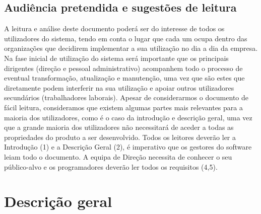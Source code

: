 \documentclass{scrreprt}
\begin{document}
	\section{Audiência pretendida e sugestões de leitura}
	
	A leitura e análise deste documento poderá ser do interesse de todos os utilizadores do sistema, tendo em conta o lugar que cada um ocupa dentro das organizações que decidirem implementar a sua utilização no dia a dia da empresa. Na fase inicial de utilização do sistema será importante que os principais dirigentes (direção e pessoal administrativo) acompanhem todo o processo de eventual transformação, atualização e manutenção, uma vez que são estes que diretamente podem interferir na sua utilização e apoiar outros utilizadores secundários (trabalhadores laborais).
	Apesar de considerarmos o documento de fácil leitura, consideramos que existem algumas partes mais relevantes para a maioria dos utilizadores, como é o caso da introdução e descrição geral, uma vez que a grande maioria dos utilizadores não necessitará de aceder a todas as propriedades do produto a ser desenvolvido. Todos os leitores deverão ler a Introdução (1) e a Descrição Geral (2), é imperativo que os gestores do software leiam todo o documento. A equipa de Direção necessita de conhecer o seu público-alvo e os programadores deverão ler todos os requisitos (4,5).
	
	
	\chapter{Descrição geral}
	
\end{document}
